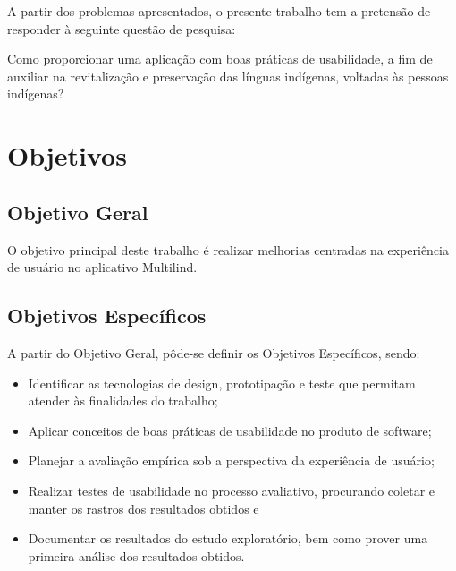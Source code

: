 A partir dos problemas apresentados, o presente trabalho tem a pretensão de responder à seguinte questão de pesquisa:

Como proporcionar uma aplicação com boas práticas de usabilidade, a fim de auxiliar na revitalização e preservação das línguas indígenas, voltadas às pessoas indígenas?

\section{Objetivos}
\label{sec:Objetivos}

\subsection{Objetivo Geral}
\label{sec:ObjetivoGeral}

O objetivo principal deste trabalho é realizar melhorias centradas na experiência de usuário no aplicativo Multilind.

\subsection{Objetivos Específicos}
\label{sec:ObjetivosEspecificos}

\begin{description}
    \item A partir do Objetivo Geral, pôde-se definir os Objetivos Específicos, sendo:
          \begin{itemize}
              \item Identificar as tecnologias de design, prototipação e teste que permitam atender às finalidades do trabalho;

              \item Aplicar conceitos de boas práticas de usabilidade no produto de software;

              \item Planejar a avaliação empírica sob a perspectiva da experiência de usuário;

              \item Realizar testes de usabilidade no processo avaliativo, procurando coletar e manter os rastros dos resultados obtidos e

              \item Documentar os resultados do estudo exploratório, bem como prover uma primeira análise dos resultados obtidos.
          \end{itemize}
\end{description}

